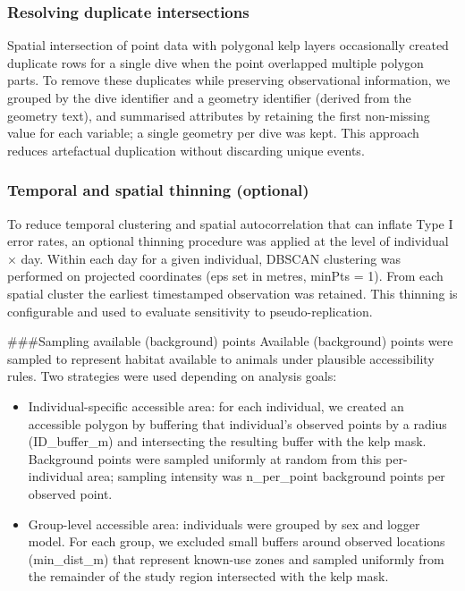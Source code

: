 \documentclass[
  letterpaper,
  DIV=11,
  numbers=noendperiod]{scrartcl}
\begin{document}
\subsubsection{Resolving duplicate
intersections}\label{resolving-duplicate-intersections}

Spatial intersection of point data with polygonal kelp layers
occasionally created duplicate rows for a single dive when the point
overlapped multiple polygon parts. To remove these duplicates while
preserving observational information, we grouped by the dive identifier
and a geometry identifier (derived from the geometry text), and
summarised attributes by retaining the first non-missing value for each
variable; a single geometry per dive was kept. This approach reduces
artefactual duplication without discarding unique events.

\subsubsection{Temporal and spatial thinning
(optional)}\label{temporal-and-spatial-thinning-optional}

To reduce temporal clustering and spatial autocorrelation that can
inflate Type I error rates, an optional thinning procedure was applied
at the level of individual × day. Within each day for a given
individual, DBSCAN clustering was performed on projected coordinates
(eps set in metres, minPts = 1). From each spatial cluster the earliest
timestamped observation was retained. This thinning is configurable and
used to evaluate sensitivity to pseudo-replication.

\#\#\#Sampling available (background) points Available (background)
points were sampled to represent habitat available to animals under
plausible accessibility rules. Two strategies were used depending on
analysis goals:

\begin{itemize}
\item
  Individual-specific accessible area: for each individual, we created
  an accessible polygon by buffering that individual's observed points
  by a radius (ID\_buffer\_m) and intersecting the resulting buffer with
  the kelp mask. Background points were sampled uniformly at random from
  this per-individual area; sampling intensity was n\_per\_point
  background points per observed point.
\item
  Group-level accessible area: individuals were grouped by sex and
  logger model. For each group, we excluded small buffers around
  observed locations (min\_dist\_m) that represent known-use zones and
  sampled uniformly from the remainder of the study region intersected
  with the kelp mask.
\end{itemize}
\end{document}
